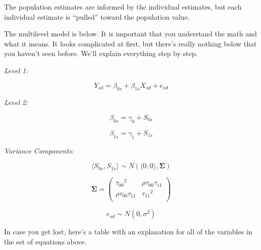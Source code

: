 \documentclass[]{book}
\begin{document}
The population estimates are informed by the individual estimates, but each individual estimate is ``pulled'' toward the population value.

The multilevel model is below. It is important that you understand the math and what it means. It looks complicated at first, but there's really nothing below that you haven't seen before. We'll explain everything step by step.

\emph{Level 1:}

\begin{equation}
Y_{sd} = \beta_{0s} + \beta_{1s} X_{sd} + e_{sd}
\end{equation}

\emph{Level 2:}

\begin{equation}
\beta_{0s} = \gamma_{0} + S_{0s}
\end{equation}

\begin{equation}
\beta_{1s} = \gamma_{1} + S_{1s}
\end{equation}

\emph{Variance Components:}

\begin{equation}
 \langle S_{0s}, S_{1s} \rangle \sim N\left(\langle 0, 0 \rangle, \mathbf{\Sigma}\right) 
\end{equation}

\begin{equation}
\mathbf{\Sigma} = \left(\begin{array}{cc}{\tau_{00}}^2 & \rho\tau_{00}\tau_{11} \\
         \rho\tau_{00}\tau_{11} & {\tau_{11}}^2 \\
         \end{array}\right) 
\end{equation}

\begin{equation}
e_{sd} \sim N\left(0, \sigma^2\right)
\end{equation}

In case you get lost, here's a table with an explanation for all of the variables in the set of equations above.
\end{document}
